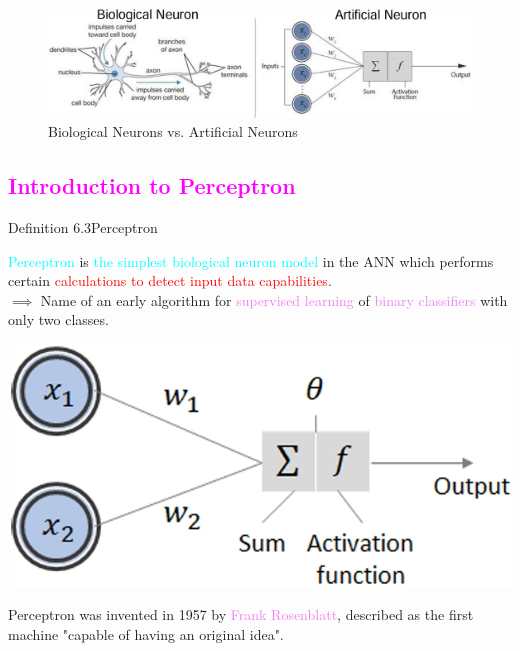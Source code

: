 \documentclass{book}
\begin{document}
\begin{figure}[h]
    \centering
    \includegraphics[scale=0.3]{chapter 6/ch6_figure4.jpeg}
    \caption{Biological Neurons vs. Artificial Neurons}
\end{figure}
\textcolor{magenta}{\section{\textbf{Introduction to Perceptron}}}
\begin{defBox}{Definition 6.3}{Perceptron}
    \raggedright
    \textcolor{cyan}{Perceptron} is \textcolor{cyan}{the simplest biological neuron model} in the ANN which performs certain \textcolor{red}{calculations to detect input data capabilities}.\\
    $\implies$ Name of an early algorithm for \textcolor{violet}{supervised learning} of \textcolor{violet}{binary classifiers} with only two classes.
    \begin{center}
        \includegraphics[scale=0.3]{chapter 6/ch6_figure5.jpeg}
    \end{center}
\end{defBox}
Perceptron was invented in 1957 by \textcolor{violet}{Frank Rosenblatt}, described as the first machine "capable of having an original idea".
\newpage
\end{document}
